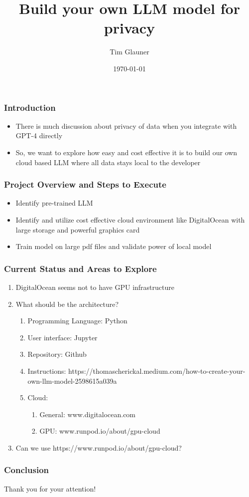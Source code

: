 \documentclass{beamer}
\title{Build your own LLM model for privacy}
\author{Tim Glauner}
\date{\today}
\begin{document}
\frame{\titlepage}

\begin{frame}
	\frametitle{Introduction}
	\begin{itemize}  
		\item There is much discussion about privacy of data when you integrate with GPT-4 directly
		\item So, we want to explore how easy and cost effective it is to build our own cloud based LLM where all data stays local to the developer
	\end{itemize}
\end{frame}

\begin{frame}
  \frametitle{Project Overview and Steps to Execute}
  \begin{itemize}
    \item Identify pre-trained LLM
    \item Identify and utilize cost effective cloud environment like DigitalOcean with large storage and powerful graphics card
    \item Train model on large pdf files and validate power of local model
  \end{itemize}
\end{frame}

\begin{frame}
  \frametitle{Current Status and Areas to Explore}
  \begin{enumerate}
    \item DigitalOcean seems not to have GPU infrastructure
    \item What should be the architecture?
	\begin{enumerate}
		\item Programming Language: Python
		\item User interface: Jupyter
		\item Repository: Github
		\item Instructions: https://thomascherickal.medium.com/how-to-create-your-own-llm-model-2598615a039a
		\item Cloud: 
		\begin{enumerate}
			\item General: www.digitalocean.com
			\item GPU: www.runpod.io/about/gpu-cloud
		\end{enumerate}
	\end{enumerate}
    \item Can we use https://www.runpod.io/about/gpu-cloud?
  \end{enumerate}
\end{frame}



\begin{frame}
	\frametitle{Conclusion}
  	Thank you for your attention!
\end{frame}
\end{document}

